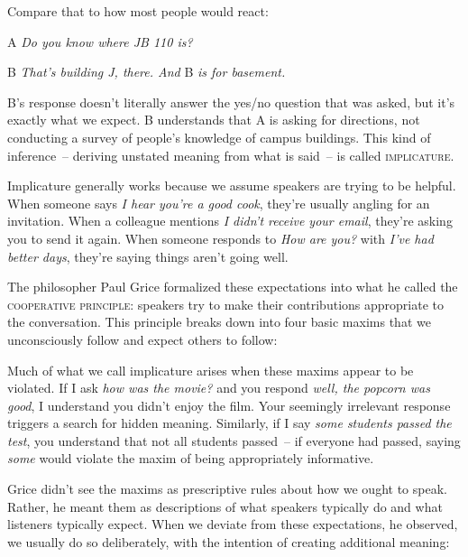 Compare that to how most people would react:

\begin{dialogue}
\item[A] \textit{Do you know where JB 110 is?}
\item[B] \textit{That's building J, there. And }B\textit{ is for basement.}
\end{dialogue}

B's response doesn't literally answer the yes/no question that was asked, but it's exactly what we expect. B understands that A is asking for directions, not conducting a survey of people's knowledge of campus buildings. This kind of inference~-- deriving unstated meaning from what is said~-- is called \textsc{implicature}.

Implicature generally works because we assume speakers are trying to be helpful. When someone says \textit{I hear you're a good cook}, they're usually angling for an invitation. When a colleague mentions \textit{I didn't receive your email}, they're asking you to send it again. When someone responds to \textit{How are you?} with \textit{I've had better days}, they're saying things aren't going well.

The philosopher Paul Grice formalized these expectations into what he called the \textsc{cooperative principle}: speakers try to make their contributions appropriate to the conversation. This principle breaks down into four basic maxims that we unconsciously follow and expect others to follow:

\ea
   \z
\z

Much of what we call implicature arises when these maxims appear to be violated. If I ask \textit{how was the movie?} and you respond \textit{well, the popcorn was good}, I understand you didn't enjoy the film. Your seemingly irrelevant response triggers a search for hidden meaning. Similarly, if I say \textit{some students passed the test}, you understand that not all students passed~-- if everyone had passed, saying \textit{some} would violate the maxim of being appropriately informative.

Grice didn't see the maxims as prescriptive rules about how we ought to speak. Rather, he meant them as descriptions of what speakers typically do and what listeners typically expect. When we deviate from these expectations, he observed, we usually do so deliberately, with the intention of creating additional meaning:

